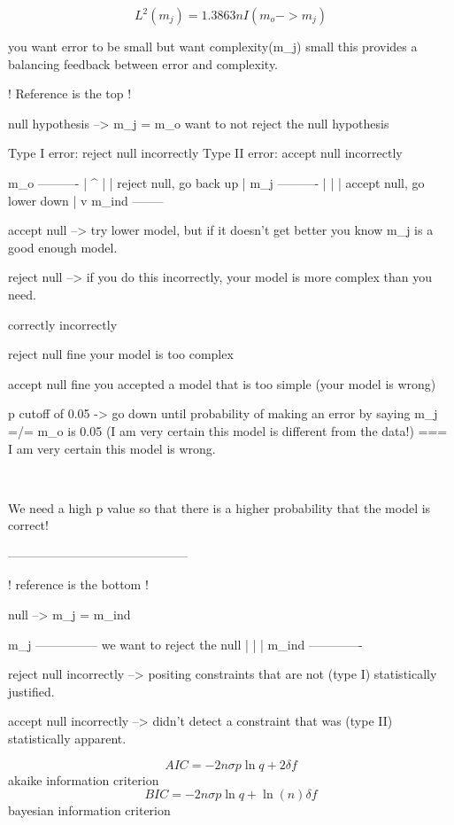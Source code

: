 $$ L^2(m_j)=1.3863nI(m_o->m_j) $$

you want error to be small
but want complexity(m_j) small
this provides a balancing feedback between error and complexity.

! Reference is the top !

null hypothesis --> m_j = m_o
want to not reject the null hypothesis

Type I error: reject null incorrectly
Type II error: accept null incorrectly

m_o ----------
|              ^
|              | reject null, go back up
|
m_j ----------
|                
|              | accept null, go lower down
|              v 
m_ind --------


accept null --> try lower model, but if it doesn't get better you know m_j is a good enough model.

reject null --> if you do this incorrectly, your model is more complex than you need.

                 correctly       incorrectly
     
reject null        fine       your model is too complex

accept null        fine       you accepted a model that is too simple
                                    (your model is wrong)


p cutoff of 0.05 -> go down until probability of making an error by saying m_j =/= m_o is 0.05 (I am very certain this model is different from the data!)  === I am very certain this model is wrong. 

~~~~~~~~~~~~~~~~~~~~~~~~~~~~~~~~~~~~~~~~

We need a high p value so that there is a higher probability that the model is correct!

--------------------------------------------

! reference is the bottom !


null --> m_j = m_ind

m_j ---------------     we want to reject the null
|
|
|
m_ind -------------


reject null incorrectly --> positing constraints that are not 
 (type I)                     statistically justified.

accept null incorrectly --> didn't detect a constraint that was
 (type II)                    statistically apparent.

$$ AIC=-2n\sigma p\ln q + 2\delta f $$
akaike information criterion
$$ BIC=-2n\sigma p\ln q + \ln(n)\delta f $$
bayesian information criterion 